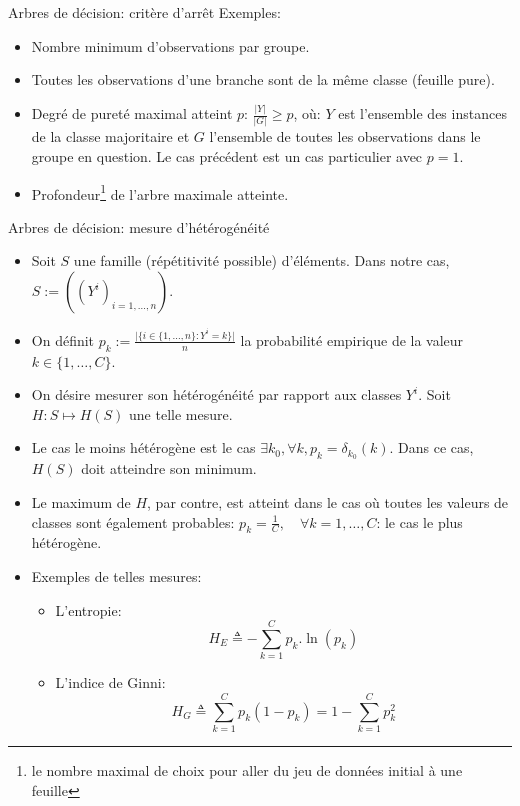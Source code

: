 \documentclass[8pt]{beamer}
\begin{document}
				\begin{frame}{Arbres de décision: critère d'arrêt}
					Exemples:
					\begin{itemize}
						\item<1-> Nombre minimum d’observations par groupe.
						\item<2-> Toutes les observations d’une branche sont de la même classe (feuille pure).
						\item<3-> Degré de pureté maximal atteint \(p\): \(\frac{\vert Y \vert}{\vert G\vert} \geq p\), où: \(Y\) est l'ensemble des instances de la classe majoritaire et \(G\) l'ensemble de toutes les observations dans le groupe en question. Le cas précédent est un cas particulier avec \(p = 1\).
						\item<4-> Profondeur\footnote{le nombre maximal de choix pour aller du jeu de données initial à une feuille} de l’arbre maximale atteinte.
					\end{itemize}
				\end{frame}
				\begin{frame}{Arbres de décision: mesure d'hétérogénéité}
					\begin{itemize}
						\item<1-> Soit \(S\) une famille (répétitivité possible) d'éléments. Dans notre cas, \(S := ((Y^i)_{i=1,\dots,n})\).
						\item<2-> On définit \(p_k := \frac{\vert \big\{i \in \{1,\dots,n\}: Y^i = k\big\}\vert}{n}\) la probabilité empirique de la valeur \(k \in \{1,\dots,C\}\).
						\item<3-> On désire mesurer son hétérogénéité par rapport aux classes \(Y^i\). Soit \(H: S\mapsto H(S)\) une telle mesure.
						\item<4-> Le cas le moins hétérogène est le cas \(\exists k_0, \forall k, p_k = \delta_{k_0}(k)\). Dans ce cas, \(H(S)\) doit atteindre son minimum.
						\item<5-> Le maximum de \(H\), par contre, est atteint dans le cas où toutes les valeurs de classes sont également probables: \(p_k = \frac{1}{C}, \quad \forall k=1,\dots,C\): le cas le plus hétérogène.
						\item<6-> Exemples de telles mesures:
							\begin{itemize}
								\item L'entropie:
									\begin{equation}
										H_E \triangleq - \sum_{k=1}^C p_k . \ln(p_k)
									\end{equation}
								\item L'indice de Ginni:
									\begin{equation}
										H_G \triangleq \sum_{k=1}^C p_k(1-p_k) = 1 - \sum_{k=1}^C p_k^2
									\end{equation}
							\end{itemize}
					\end{itemize}
				\end{frame}
\end{document}
